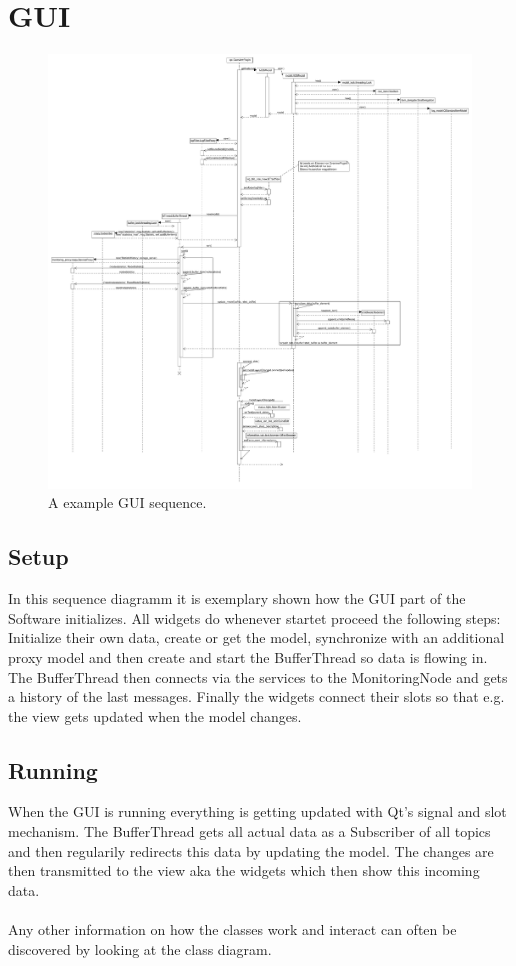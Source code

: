 \newpage
\section{GUI}
\begin{figure}[!ht]
	\begin{center}
		\includegraphics[width=1.0\linewidth]{./diagram_pictures/GUI_seq.pdf}
		\caption{A example GUI sequence.}
	\end{center}
\end{figure}

\subsection*{Setup}
In this sequence diagramm it is exemplary shown how the GUI part of the Software initializes.
All widgets do whenever startet proceed the following steps: Initialize their own data, create or get the model, synchronize with an additional proxy model and then create and start the BufferThread so data is flowing in. The BufferThread then connects via the services to the MonitoringNode and gets a history of the last messages.
Finally the widgets connect their slots so that e.g. the view gets updated when the model changes.

\subsection*{Running}
When the GUI is running everything is getting updated with Qt's signal and slot mechanism. The BufferThread gets all actual data as a Subscriber of all topics and then regularily redirects this data by updating the model. The changes are then transmitted to the view aka the widgets which then show this incoming data.
\\
\\Any other information on how the classes work and interact can often be discovered by looking at the class diagram.